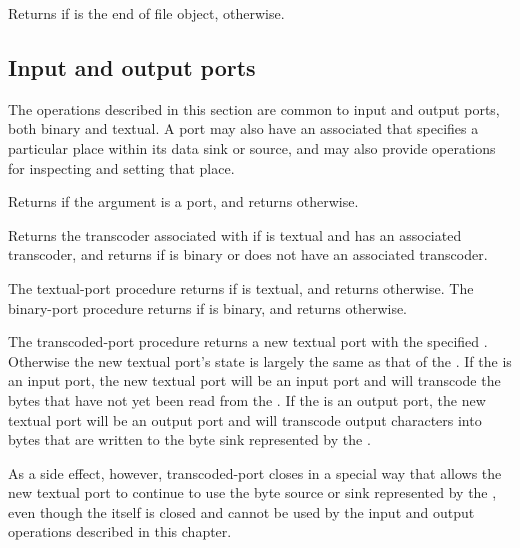 \begin{entry}{%
}
  
Returns \schtrue{} if  is the end of file object, \schfalse{} otherwise.
\end{entry}

\subsection{Input and output ports}

The operations described in this section are common to input and
output ports, both binary and textual.  A port may also have an
associated  that specifies a particular place
within its data sink or source, and may also provide operations for
inspecting and setting that place.

\begin{entry}{%
}
   
Returns \schtrue{} if the argument is a port, and returns \schfalse{}
otherwise.
\end{entry}

\begin{entry}{%
}

Returns the transcoder associated with  if  is
textual and has an associated transcoder, and returns \schfalse{} if
 is binary or does not have an associated transcoder.
\end{entry}

\begin{entry}{%
}

The {\cf textual-port} procedure returns \schtrue{} if  is
textual, and returns \schfalse{} otherwise.
The {\cf binary-port} procedure returns \schtrue{} if  is
binary, and returns \schfalse{} otherwise.
\end{entry}

\begin{entry}{%
}

The {\cf transcoded-port} procedure
returns a new textual port with the specified .
Otherwise the new textual port's state is largely the same as
that of the .
If the  is an input port, the new textual
port will be an input port and
will transcode the bytes that have not yet been read from
the .
If the  is an output port, the new textual
port will be an output port and
will transcode output characters into bytes that are
written to the byte sink represented by the .

As a side effect, however, {\cf transcoded-port}
closes  in
a special way that allows the new textual port to continue to
use the byte source or sink represented by the ,
even though the  itself is closed and cannot
be used by the input and output operations described in this
chapter.
\end{entry}

